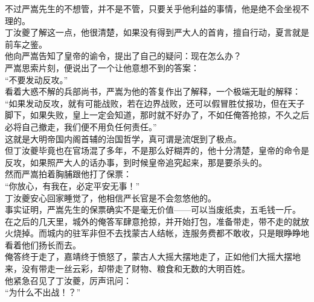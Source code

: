 \begin{multicols}{\theparacolNo}
不过严嵩先生的不想管，并不是不管，只要关乎他利益的事情，他是绝不会坐视不理的。\\

丁汝夔了解这一点，他很清楚，如果没有得到严大人的首肯，擅自行动，夏言就是前车之鉴。\\

他向严嵩告知了皇帝的谕令，提出了自己的疑问：现在怎么办？\\

严嵩思索片刻，便说出了一个让他意想不到的答案：\\

“不要发动反攻。”\\

看着大惑不解的兵部尚书，严嵩为他的答复作出了解释，一个极端无耻的解释：\\

“如果发动反攻，就有可能战败，若在边界战败，还可以假冒胜仗报功，但在天子脚下，如果失败，皇上一定会知道，那时就不好办了，不如任俺答抢掠，不久之后必将自己撤走，我们便不用负任何责任。”\\

这就是大明帝国内阁首辅的治国哲学，真可谓是流氓到了极点。\\

但丁汝夔毕竟也在官场混了多年，不是那么好糊弄的，他十分清楚，皇帝的命令是反攻，如果照严大人的话办事，到时候皇帝追究起来，那是要杀头的。\\

然而严嵩拍着胸脯跟他打了保票：\\

“你放心，有我在，必定平安无事！”\\

丁汝夔安心回家睡觉了，他相信严长官是不会忽悠他的。\\

事实证明，严嵩先生的保票确实不是毫无价值——可以当废纸卖，五毛钱一斤。\\

在之后的几天里，城外的俺答军肆意抢掠，并开始打包，准备带走，带不走的就放火烧掉。而城内的驻军非但不去找蒙古人结帐，连服务费都不敢收，只是眼睁睁地看着他们扬长而去。\\

俺答终于走了，嘉靖终于愤怒了，蒙古人大摇大摆地走了，正如他们大摇大摆地来，没有带走一丝云彩，却带走了财物、粮食和无数的大明百姓。\\

他紧急召见了丁汝夔，厉声讯问：\\

“为什么不出战！？”\\


\end{multicols}
